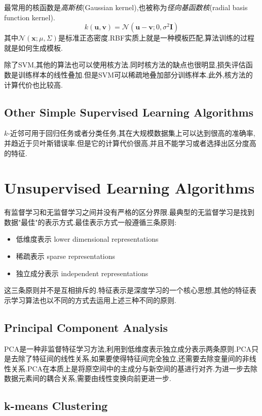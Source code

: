 最常用的核函数是\textit{高斯核}(Gaussian kernel),也被称为\textit{径向基函数核}(radial basis function kernel).
\begin{equation}
k(\mathbf{u,v})=\mathcal N(\mathbf{u-v};0,\sigma^2\mathbf I)
\end{equation}
其中$\mathcal N(\mathbf x;\mu,\Sigma)$是标准正态密度.RBF实质上就是一种模板匹配,算法训练的过程就是如何生成模板.

除了SVM,其他的算法也可以使用核方法.同时核方法的缺点也很明显,损失评估函数是训练样本的线性叠加.但是SVM可以稀疏地叠加部分训练样本.此外,核方法的计算代价也比较高.

\subsection{Other Simple Supervised Learning Algorithms}

$k$-近邻可用于回归任务或者分类任务,其在大规模数据集上可以达到很高的准确率,并趋近于贝叶斯错误率.但是它的计算代价很高,并且不能学习或者选择出区分度高的特征.

\section{Unsupervised Learning Algorithms}

有监督学习和无监督学习之间并没有严格的区分界限.最典型的无监督学习是找到数据"最佳"的表示方式.最佳表示方式一般遵循三条原则:
\begin{itemize}
\item 低维度表示 lower dimensional representations
\item 稀疏表示 sparse representations
\item 独立成分表示 independent representations
\end{itemize}
这三条原则并不是互相排斥的.特征表示是深度学习的一个核心思想,其他的特征表示学习算法也以不同的方式去运用上述三种不同的原则.

\subsection{Principal Component Analysis}

PCA是一种非监督特征学习方法,利用到低维度表示独立成分表示两条原则.PCA只是去除了特征间的线性关系,如果要使得特征间完全独立,还需要去除变量间的非线性关系.PCA在本质上是将原空间中的主成分与新空间的基进行对齐.为进一步去除数据元素间的耦合关系,需要由线性变换向前更进一步.

\subsection{k-means Clustering}

